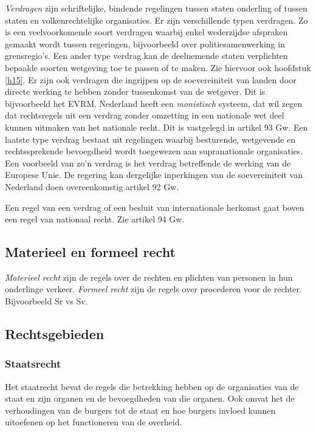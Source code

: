 \documentclass{article}
\begin{document}
\emph{Verdragen} zijn schriftelijke, bindende regelingen tussen staten
onderling of tussen staten en volkenrechtelijke organisaties. Er zijn
verschillende typen verdragen. Zo is een veelvoorkomende soort verdragen
waarbij enkel wederzijdse afspraken gemaakt wordt tussen regeringen,
bijvoorbeeld over politiesamenwerking in grensregio's. Een ander type verdrag
kan de deelnemende staten verplichten bepaalde soorten wetgeving toe te passen
of te maken. Zie hiervoor ook hoofdstuk \ref{h15}. Er zijn ook verdragen die
ingrijpen op de soevereiniteit van landen door directe werking te hebben zonder
tussenkomst van de wetgever. Dit is bijvoorbeeld het EVRM. Nederland heeft een
\emph{monistisch} systeem, dat wil zegen dat rechtsregels uit een verdrag
zonder omzetting in een nationale wet deel kunnen uitmaken van het nationale
recht. Dit is vastgelegd in artikel 93 Gw. Een laatste type verdrag bestaat uit
regelingen waarbij besturende, wetgevende en rechtssprekende bevoegdheid wordt
toegewezen aan supranationale organisaties. Een voorbeeld van zo'n verdrag is
het verdrag betreffende de werking van de Europese Unie. De regering kan
dergelijke inperkingen van de soevereiniteit van Nederland doen overeenkomstig
artikel 92 Gw.

Een regel van een verdrag of een besluit van internationale herkomst gaat boven
een regel van nationaal recht. Zie artikel 94 Gw.

\subsection{Materieel en formeel recht}

\emph{Materieel recht} zijn de regels over de rechten en plichten van personen
in hun onderlinge verkeer. \emph{Formeel recht} zijn de regels over procederen
voor de rechter. Bijvoorbeeld Sr vs Sv.

\subsection{Rechtsgebieden}

\subsubsection{Staatsrecht}

Het staatrecht bevat de regels die betrekking hebben op de organisaties van de
staat en zijn organen en de bevoegdheden van die organen. Ook omvat het de
verhoudingen van de burgers tot de staat en hoe burgers invloed kunnen
uitoefenen op het functioneren van de overheid.
\end{document}
